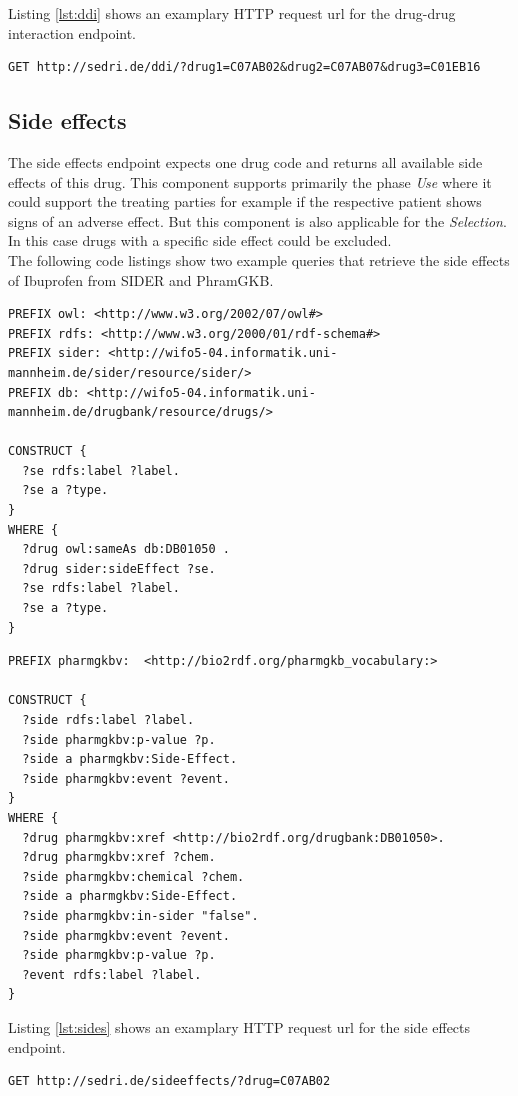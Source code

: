 Listing \ref{lst:ddi} shows an examplary HTTP request url for the drug-drug interaction endpoint.
\begin{lstlisting}[label=lst:ddi,caption=Example request for the drug-drug interaction endpoint]
  GET http://sedri.de/ddi/?drug1=C07AB02&drug2=C07AB07&drug3=C01EB16
\end{lstlisting}

\subsection*{Side effects}
The side effects endpoint expects one drug code and returns all available side effects of this drug.
This component supports primarily the phase \textit{Use} where it could support the treating parties for example if the respective patient shows signs of an adverse effect.
But this component is also applicable for the \textit{Selection}.
In this case drugs with a specific side effect could be excluded.\\
The following code listings show two example queries that retrieve the side effects of Ibuprofen from SIDER and PhramGKB.
\begin{lstlisting}[caption=Example SIDER query for side effects of Ibuprofen]
PREFIX owl: <http://www.w3.org/2002/07/owl#>
PREFIX rdfs: <http://www.w3.org/2000/01/rdf-schema#>
PREFIX sider: <http://wifo5-04.informatik.uni-mannheim.de/sider/resource/sider/>
PREFIX db: <http://wifo5-04.informatik.uni-mannheim.de/drugbank/resource/drugs/>

CONSTRUCT {
  ?se rdfs:label ?label.
  ?se a ?type.
}
WHERE {
  ?drug owl:sameAs db:DB01050 .
  ?drug sider:sideEffect ?se.
  ?se rdfs:label ?label.
  ?se a ?type.
}
\end{lstlisting}
\begin{lstlisting}[caption=Example PharmGKB query for side effects of Ibuprofen that are not listed in SIDER]
PREFIX pharmgkbv:  <http://bio2rdf.org/pharmgkb_vocabulary:>

CONSTRUCT {
  ?side rdfs:label ?label.
  ?side pharmgkbv:p-value ?p.
  ?side a pharmgkbv:Side-Effect.
  ?side pharmgkbv:event ?event.
}
WHERE {
  ?drug pharmgkbv:xref <http://bio2rdf.org/drugbank:DB01050>.
  ?drug pharmgkbv:xref ?chem.
  ?side pharmgkbv:chemical ?chem.
  ?side a pharmgkbv:Side-Effect.
  ?side pharmgkbv:in-sider "false".
  ?side pharmgkbv:event ?event.
  ?side pharmgkbv:p-value ?p.
  ?event rdfs:label ?label.
}
\end{lstlisting}
Listing \ref{lst:sides} shows an examplary HTTP request url for the side effects endpoint.
\begin{lstlisting}[label=lst:sides,caption=Example request for the side effects endpoint]
  GET http://sedri.de/sideeffects/?drug=C07AB02
\end{lstlisting}

